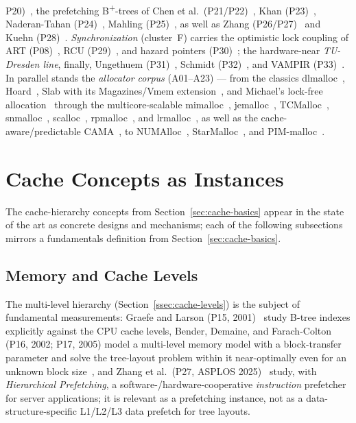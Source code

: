 P20)~\cite{mueller2025btreesback}, the prefetching B\textsuperscript{+}-trees of Chen et
al.\ (P21/P22)~\cite{chen2001prefetch,chen2002fractal}, Khan (P23)~\cite{khan2010adaptive},
Naderan-Tahan (P24)~\cite{naderan2016adaptivefilter}, Mahling (P25)~\cite{mahling2025hotpath}, as
well as Zhang (P26/P27)~\cite{zhang2024pathprefix,zhang2025hierarchical} and Kuehn
(P28)~\cite{kuehn2023bplustree}\@. \emph{Synchronization} (cluster~F) carries the optimistic lock
coupling of ART (P08)~\cite{leis2016olc}, RCU (P29)~\cite{mckenney2001rcu}, and hazard pointers
(P30)~\cite{michael2004hazard}; the hardware-near \emph{TU-Dresden line}, finally, Ungethuem
(P31)~\cite{ungethuem2017survey}, Schmidt (P32)~\cite{schmidt2025hbm}, and VAMPIR
(P33)~\cite{berthold2023vampir}. In parallel stands the \emph{allocator corpus} (A01--A23) --- from
the classics dlmalloc~\cite{lea1996dlmalloc}, Hoard~\cite{berger2000hoard}, Slab with its
Magazines/Vmem extension~\cite{bonwick1994slab,bonwick2001vmem}, and Michael's lock-free
allocation~\cite{michael2004lockfree} through the multicore-scalable
mimalloc~\cite{leijen2019mimalloc}, jemalloc~\cite{evans2006jemalloc},
TCMalloc~\cite{ghemawat2005tcmalloc}, snmalloc~\cite{lietar2019snmalloc},
scalloc~\cite{aigner2015scalloc}, rpmalloc~\cite{jansson2017rpmalloc}, and
lrmalloc~\cite{leite2018lrmalloc}, as well as the cache-aware/predictable
CAMA~\cite{herter2011cama}, to NUMAlloc~\cite{yang2023numalloc}, StarMalloc~\cite{starmalloc2024},
and PIM-malloc~\cite{pimmalloc2026}.

\section{Cache Concepts as Instances}\label{sec:sota-cache}
The cache-hierarchy concepts from Section~\ref{sec:cache-basics} appear in the state of the art as
concrete designs and mechanisms; each of the following subsections mirrors a fundamentals definition
from Section~\ref{sec:cache-basics}.

\subsection{Memory and Cache Levels}\label{ssec:sota-levels}
The multi-level hierarchy (Section~\ref{ssec:cache-levels}) is the subject of fundamental
measurements: Graefe and Larson (P15, 2001)~\cite{graefe2001btree} study B-tree indexes explicitly
against the CPU cache levels, Bender, Demaine, and Farach-Colton (P16, 2002; P17, 2005) model a
multi-level memory model with a block-transfer parameter and solve the tree-layout problem within it
near-optimally even for an unknown block size~\cite{bender2002treelayout}, and Zhang et al.\ (P27,
ASPLOS 2025)~\cite{zhang2025hierarchical} study, with \emph{Hierarchical Prefetching}, a
software-/hardware-cooperative \emph{instruction} prefetcher for server applications; it is relevant
as a prefetching instance, not as a data-structure-specific L1/L2/L3 data prefetch for tree layouts.

